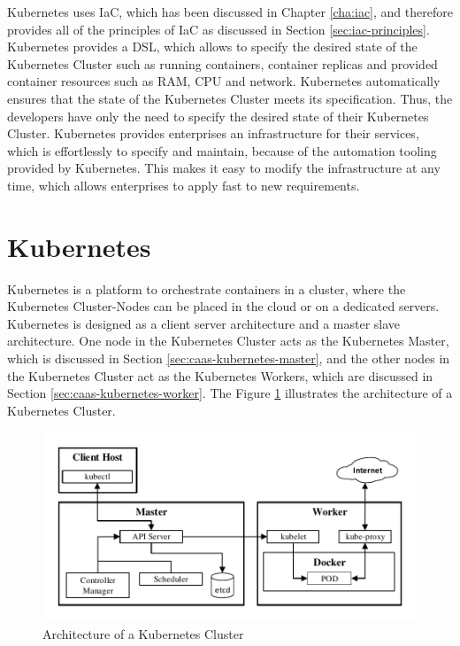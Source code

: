 Kubernetes uses IaC, which has been discussed in Chapter \vref{cha:iac}, and therefore provides all of the principles of IaC as discussed in Section \vref{sec:iac-principles}. Kubernetes provides a DSL, which allows to specify the desired state of the Kubernetes Cluster such as running containers, container replicas and provided container resources such as RAM, CPU and network. Kubernetes automatically ensures that the state of the Kubernetes Cluster meets its specification. Thus, the developers have only the need to specify the desired state of their Kubernetes Cluster. Kubernetes provides enterprises an infrastructure for their services, which is effortlessly to specify and maintain, because of the automation tooling provided by Kubernetes. This makes it easy to modify the infrastructure at any time, which allows enterprises to apply fast to new requirements.

\section{Kubernetes}
\label{sec:caas-kubernetes}
Kubernetes is a platform to orchestrate containers in a cluster, where the Kubernetes Cluster-Nodes can be placed in the cloud or on a dedicated servers. Kubernetes is designed as a client server architecture and a master slave architecture. One node in the Kubernetes Cluster acts as the Kubernetes Master, which is discussed in Section \vref{sec:caas-kubernetes-master}, and the other nodes in the Kubernetes Cluster act as the Kubernetes Workers, which are discussed in Section \vref{sec:caas-kubernetes-worker}. The Figure \ref{fig:kubernetes-cluster-architecture} illustrates the architecture of a Kubernetes Cluster.

\begin{figure}[htbp]
	\centering
	\includegraphics[scale=0.9]{images/kubernetes-cluster-architecture.pdf}
	\caption{Architecture of a Kubernetes Cluster}
	\label{fig:kubernetes-cluster-architecture}
\end{figure} 

